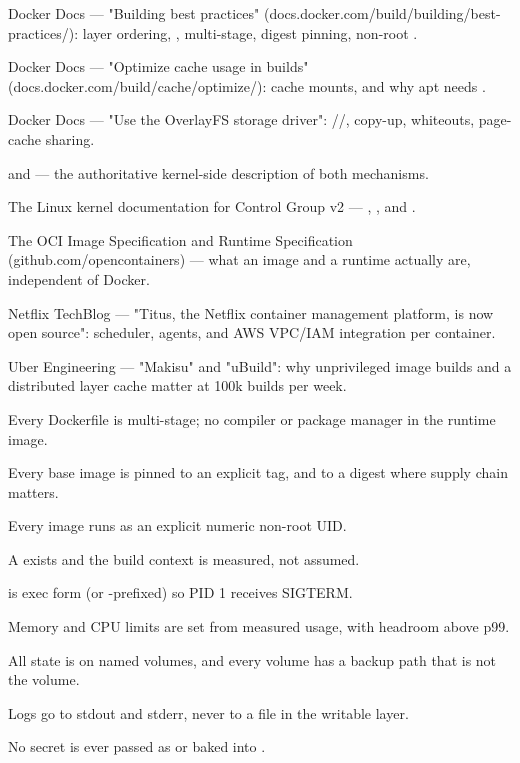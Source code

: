 \begin{wbitem}
  \item Docker Docs --- "Building best practices" (docs.docker.com/build/building/best-practices/): layer ordering, , multi-stage, digest pinning, non-root .
  \item Docker Docs --- "Optimize cache usage in builds" (docs.docker.com/build/cache/optimize/): cache mounts, and why apt needs .
  \item Docker Docs --- "Use the OverlayFS storage driver": //, copy-up, whiteouts, page-cache sharing.
  \item {} and  --- the authoritative kernel-side description of both mechanisms.
  \item The Linux kernel documentation for Control Group v2 --- , ,  and .
  \item The OCI Image Specification and Runtime Specification (github.com/opencontainers) --- what an image and a runtime actually are, independent of Docker.
  \item Netflix TechBlog --- "Titus, the Netflix container management platform, is now open source": scheduler, agents, and AWS VPC/IAM integration per container.
  \item Uber Engineering --- "Makisu" and "uBuild": why unprivileged image builds and a distributed layer cache matter at 100k builds per week.
\end{wbitem}

\begin{checklist}
  \item Every Dockerfile is multi-stage; no compiler or package manager in the runtime image.
  \item Every base image is pinned to an explicit tag, and to a digest where supply chain matters.
  \item Every image runs as an explicit numeric non-root UID.
  \item A  exists and the build context is measured, not assumed.
  \item {} is exec form (or -prefixed) so PID 1 receives SIGTERM.
  \item Memory and CPU limits are set from measured usage, with headroom above p99.
  \item All state is on named volumes, and every volume has a backup path that is not the volume.
  \item Logs go to stdout and stderr, never to a file in the writable layer.
  \item No secret is ever passed as  or baked into .
\end{checklist}

